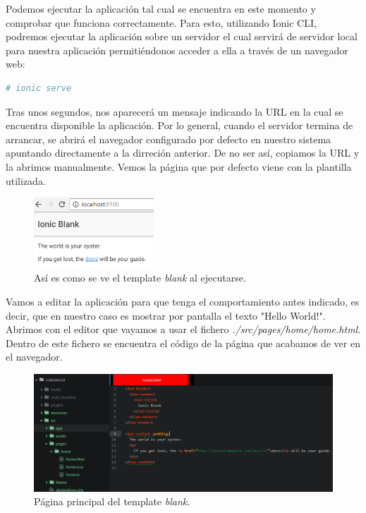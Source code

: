 Podemos ejecutar la aplicación tal cual se encuentra en este momento y comprobar que funciona correctamente. Para esto, utilizando Ionic CLI, podremos ejecutar la aplicación sobre un servidor el cual servirá de servidor local para nuestra aplicación permitiéndonos acceder a ella a través de un navegador web:

\begin{lstlisting}[language=bash]
  # ionic serve
\end{lstlisting}

Tras unos segundos, nos aparecerá un mensaje indicando la \gls{URL} en la cual se encuentra disponible la aplicación. Por lo general, cuando el servidor termina de arrancar, se abrirá el navegador configurado por defecto en nuestro sistema apuntando directamente a la dirreción anterior. De no ser así, copiamos la \gls{URL} y la abrimos manualmente.
Vemos la página que por defecto viene con la plantilla utilizada.

\begin{figure}[H]
\centering
  \includegraphics[width=0.4\textwidth,keepaspectratio]{Figures/ch2/HelloWorld/ionic_blank}
  \caption{Así es como se ve el template \emph{blank} al ejecutarse.}
\end{figure}

Vamos a editar la aplicación para que tenga el comportamiento antes indicado, es decir, que en nuestro caso es mostrar por pantalla el texto "Hello World!". Abrimos con el editor que vayamos a usar el fichero \emph{./src/pages/home/home.html}. Dentro de este fichero se encuentra el código de la página que acabamos de ver en el navegador.

\begin{figure}[H]
\centering
  \includegraphics[width=\textwidth,keepaspectratio]{Figures/ch2/HelloWorld/home_ionic_blank}
  \caption{Página principal del template \emph{blank}.}
\end{figure}

